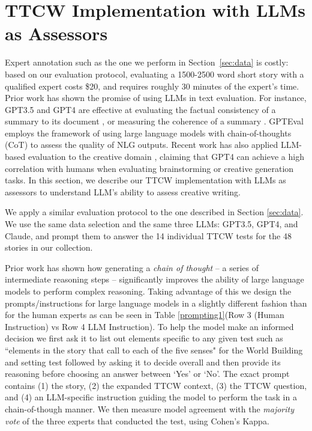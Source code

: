 \section{TTCW Implementation with LLMs as Assessors}
\label{sec:llmeval}
Expert annotation such as the one we perform in Section~\ref{sec:data} is costly: based on our evaluation protocol, evaluating a 1500-2500 word short story with a qualified expert costs \$20, and requires roughly 30 minutes of the expert's time. Prior work has shown the promise of using LLMs in text evaluation. For instance, GPT3.5 and GPT4 are effective at evaluating the factual consistency of a summary to its document \cite{laban2023llms}, or measuring the coherence of a summary \cite{gao2023human}. GPTEval \cite{liu2023gpteval} employs the framework of using large language models with chain-of-thoughts (CoT) \cite{wei2022chain} to assess the quality of NLG outputs. Recent work has also applied LLM-based evaluation to the creative domain \cite{rajani2023llm_labels}, claiming that GPT4 can achieve a high correlation with humans when evaluating brainstorming or creative generation tasks. In this section, we describe our TTCW implementation with LLMs as assessors to understand LLM's ability to assess creative writing. 


We apply a similar evaluation protocol to the one described in Section \ref{sec:data}. We use the same data selection and the same three LLMs:
GPT3.5, GPT4, and Claude, and prompt them to answer the 14 individual TTCW tests for the 48 stories in our collection. 

Prior work \citet{wei2022chain} has shown how generating a \textit{chain of thought} -- a series of intermediate reasoning steps -- significantly improves the ability of large language models to perform complex reasoning. Taking advantage of this we design the prompts/instructions for large language models in a slightly different fashion than for the human experts as can be seen in Table \ref{prompting1}(Row 3 (Human Instruction) vs Row 4 LLM Instruction). To help the model make an informed decision we first ask it to list out elements specific to any given test such as ``elements in the story that call to each of the five senses" for the World Building and setting test followed by asking it to decide overall and then provide its reasoning before choosing an answer between `Yes' or `No'.
The exact prompt contains (1) the story, (2) the expanded TTCW context, (3) the TTCW question, and (4) an LLM-specific instruction guiding the model to perform the task in a chain-of-though manner. We then measure model agreement with the \textit{majority vote} of the three experts that conducted the test, using Cohen's Kappa.

